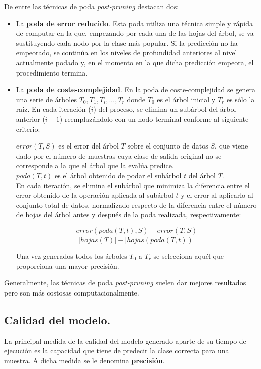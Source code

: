 De entre las técnicas de poda \textit{post-pruning} destacan dos:\\
\begin{itemize}
\item La \textbf{poda de error reducido}. Esta poda utiliza una técnica simple y rápida de computar en la que, empezando por cada una de las hojas del árbol, se va sustituyendo cada nodo por la clase más popular. Si la predicción no ha empeorado, se continúa en los niveles de profundidad anteriores al nivel actualmente podado y, en el momento en la que dicha predicción empeora, el procedimiento termina.\\

\item La \textbf{poda de coste-complejidad}. En la poda de coste-complejidad se genera una serie de árboles $T_0, T_1, T_i, ... , T_r$ donde $T_0$ es el árbol inicial y $T_r$ es sólo la raíz. En cada iteración ($i$) del proceso, se elimina un subárbol del árbol anterior ($i-1$) reemplazándolo con un nodo terminal conforme al siguiente criterio:

$error(T, S)$ es el error del árbol $T$ sobre el conjunto de datos $S$, que viene dado por el número de muestras cuya clase de salida original no se corresponde a la que el árbol que la evalúa predice.\\ $poda(T, t)$ es el árbol obtenido de podar el subárbol $t$ del árbol $T$.\\

En cada iteración, se elimina el subárbol que minimiza la diferencia entre el error obtenido de la operación aplicada al subárbol $t$ y el error al aplicarlo al conjunto total de datos, normalizado respecto de la diferencia entre el número de hojas del árbol antes y después de la poda realizada, respectivamente:

$$
\frac{error(poda(T, t), S) - error(T, S)}{|hojas(T)| - |hojas(poda(T, t))|}
$$

Una vez generados todos los árboles $T_0$ a $T_r$ se selecciona aquél que proporciona una mayor precisión.\\

\end{itemize}
Generalmente, las técnicas de poda \textit{post-pruning} suelen dar mejores resultados pero son más costosas computacionalmente.
\subsection{Calidad del modelo.}
La principal medida de la calidad del modelo generado aparte de su tiempo de ejecución es la capacidad que tiene de predecir la clase correcta para una muestra. A dicha medida se le denomina \textbf{precisión}.


